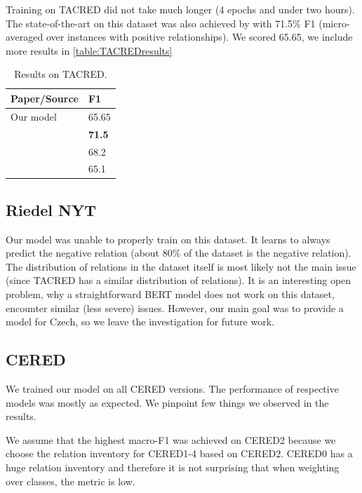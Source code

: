 Training on TACRED did not take much longer (4 epochs and under two hours). The state-of-the-art on this dataset was also achieved by \cite{baldini-soares-etal-2019-matching} with 71.5\% F1 (micro-averaged over instances with positive relationships). We scored 65.65, we include more results in \autoref{table:TACREDresults}


\begin{table}[h]
\centering
\caption{Results on TACRED.}
\label{table:TACREDresults}
\begin{tabular}{l l }
\hline
Paper/Source & F1 \\
\hline
\hline
Our model & 65.65 \\
\textbf{\cite{baldini-soares-etal-2019-matching}} & \textbf{71.5} \\
\textit{\cite{zhang-etal-2018-graph-TACRED}} & 68.2 \\
\textit{\cite{zhang-etal-2017-position_TACRED}} & 65.1 \\
\hline

\end{tabular}
\end{table}

\subsection{Riedel NYT}

Our model was unable to properly train on this dataset. It learns to always predict the negative relation (about 80\% of the dataset is the negative relation). The distribution of relations in the dataset itself is most likely not the main issue (since TACRED has a similar distribution of relations). It is an interesting open problem, why a straightforward BERT model does not work on this dataset, \cite{nyt-nefunguje} encounter similar (less severe) issues. However, our main goal was to provide a model for Czech, so we leave the investigation for future work.




\subsection{CERED}
We trained our model on all CERED versions. The performance of respective models was mostly as expected.  We pinpoint few things we observed in the results. 

We assume that the highest macro-F1 was achieved on CERED2 because we choose the relation inventory for CERED1-4 based on CERED2. CERED0 has a huge relation inventory and therefore it is not surprising that when weighting over classes, the metric is low.

